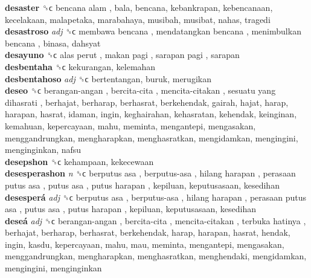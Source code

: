 \textbf{desaster} ␝ϲ   bencana alam , bala, bencana, kebankrapan, kebencanaan, kecelakaan, malapetaka, marabahaya, musibah, musibat, nahas, tragedi  \\
\textbf{desastroso} \emph{adj}  ␝ϲ   membawa bencana ,  mendatangkan bencana ,  menimbulkan bencana , binasa, dahsyat  \\
\textbf{desayuno} ␝ϲ   alas perut ,  makan pagi ,  sarapan pagi , sarapan  \\
\textbf{desbentaha} ␝ϲ  kekurangan, kelemahan  \\
\textbf{desbentahoso} \emph{adj}  ␝ϲ  bertentangan, buruk, merugikan  \\
\textbf{deseo} ␝ϲ   berangan-angan ,  bercita-cita ,  mencita-citakan ,  sesuatu yang dihasrati , berhajat, berharap, berhasrat, berkehendak, gairah, hajat, harap, harapan, hasrat, idaman, ingin, keghairahan, kehasratan, kehendak, keinginan, kemahuan, kepercayaan, mahu, meminta, mengantepi, mengasakan, menggandrungkan, mengharapkan, menghasratkan, mengidamkan, mengingini, menginginkan, nafsu  \\
\textbf{desepshon} ␝ϲ  kehampaan, kekecewaan  \\
\textbf{desesperashon} \emph{n}  ␝ϲ   berputus asa ,  berputus-asa ,  hilang harapan ,  perasaan putus asa ,  putus asa ,  putus harapan , kepiluan, keputusasaan, kesedihan  \\
\textbf{desesperá} \emph{adj}  ␝ϲ   berputus asa ,  berputus-asa ,  hilang harapan ,  perasaan putus asa ,  putus asa ,  putus harapan , kepiluan, keputusasaan, kesedihan  \\
\textbf{deseá} \emph{adj}  ␝ϲ   berangan-angan ,  bercita-cita ,  mencita-citakan ,  terbuka hatinya , berhajat, berharap, berhasrat, berkehendak, harap, harapan, hasrat, hendak, ingin, kasdu, kepercayaan, mahu, mau, meminta, mengantepi, mengasakan, menggandrungkan, mengharapkan, menghasratkan, menghendaki, mengidamkan, mengingini, menginginkan  \\
